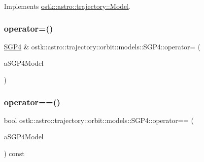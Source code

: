 Implements \hyperlink{classostk_1_1astro_1_1trajectory_1_1_model_a2dd77b9f6939d738f3a489f26c955340}{ostk\+::astro\+::trajectory\+::\+Model}.

\mbox{\label{classostk_1_1astro_1_1trajectory_1_1orbit_1_1models_1_1_s_g_p4_a8f8d3633270de5c9d8c99f047f28d0f0}} 
\subsubsection{\texorpdfstring{operator=()}{operator=()}}
{\footnotesize\ttfamily \hyperlink{classostk_1_1astro_1_1trajectory_1_1orbit_1_1models_1_1_s_g_p4}{S\+G\+P4} \& ostk\+::astro\+::trajectory\+::orbit\+::models\+::\+S\+G\+P4\+::operator= (\begin{DoxyParamCaption}\item[{const \hyperlink{classostk_1_1astro_1_1trajectory_1_1orbit_1_1models_1_1_s_g_p4}{S\+G\+P4} \&}]{a\+S\+G\+P4\+Model }\end{DoxyParamCaption})}

\mbox{\label{classostk_1_1astro_1_1trajectory_1_1orbit_1_1models_1_1_s_g_p4_ac95f88e801e75d53c2908cfc55d743a0}} 
\subsubsection{\texorpdfstring{operator==()}{operator==()}\hspace{0.1cm}{\footnotesize\ttfamily [1/2]}}
{\footnotesize\ttfamily bool ostk\+::astro\+::trajectory\+::orbit\+::models\+::\+S\+G\+P4\+::operator== (\begin{DoxyParamCaption}\item[{const \hyperlink{classostk_1_1astro_1_1trajectory_1_1orbit_1_1models_1_1_s_g_p4}{S\+G\+P4} \&}]{a\+S\+G\+P4\+Model }\end{DoxyParamCaption}) const}

